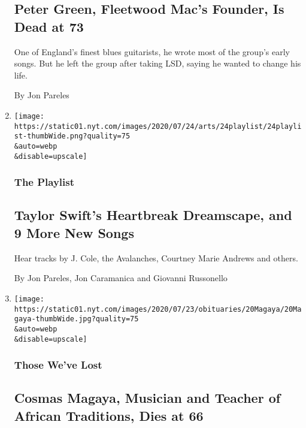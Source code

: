 \begin{enumerate}
  \hypertarget{peter-green-fleetwood-macs-founder-is-dead-at-73}{%
  \subsection{Peter Green, Fleetwood Mac's Founder, Is Dead at
  73}\label{peter-green-fleetwood-macs-founder-is-dead-at-73}}

  One of England's finest blues guitarists, he wrote most of the group's
  early songs. But he left the group after taking LSD, saying he wanted
  to change his life.

  By Jon Pareles
\item
  \href{/2020/07/24/arts/music/playlist-taylor-swift-j-cole-drake.html}{}

  \texttt{[image: https://static01.nyt.com/images/2020/07/24/arts/24playlist/24playlist-thumbWide.png?quality=75\\\&auto=webp\\\&disable=upscale]}

  \hypertarget{the-playlist-1}{%
  \subsubsection{The Playlist}\label{the-playlist-1}}

  \hypertarget{taylor-swifts-heartbreak-dreamscape-and-9-more-new-songs}{%
  \subsection{Taylor Swift's Heartbreak Dreamscape, and 9 More New
  Songs}\label{taylor-swifts-heartbreak-dreamscape-and-9-more-new-songs}}

  Hear tracks by J. Cole, the Avalanches, Courtney Marie Andrews and
  others.

  By Jon Pareles, Jon Caramanica and Giovanni Russonello
\item
  \href{/2020/07/21/obituaries/cosmas-magaya-dead-coronavirus.html}{}

  \texttt{[image: https://static01.nyt.com/images/2020/07/23/obituaries/20Magaya/20Magaya-thumbWide.jpg?quality=75\\\&auto=webp\\\&disable=upscale]}

  \hypertarget{those-weve-lost}{%
  \subsubsection{Those We've Lost}\label{those-weve-lost}}

  \hypertarget{cosmas-magaya-musician-and-teacher-of-african-traditions-dies-at-66}{%
  \subsection{Cosmas Magaya, Musician and Teacher of African Traditions,
  Dies at
  66}\label{cosmas-magaya-musician-and-teacher-of-african-traditions-dies-at-66}}


\end{enumerate}
